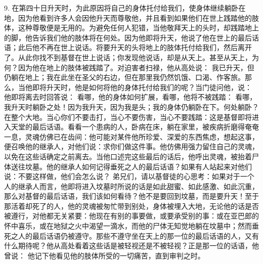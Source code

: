 9. 在第四十日升天时，为此原因将自己的身体托付给我们，使身体继续躺卧在地，因为他看到许多人会因他升天而尊敬他，并且看到如果他们在世上践踏他的肢体，这种尊敬便是无用的。为避免任何人犯错，当他敬拜天上的头时，却践踏地上的脚，他告诉我们他的肢体将在何处。因为他即将升天，他说了他在世上的最后话语；此后他不再在世上说话。将要升天的头将地上的肢体托付给我们，然后离开了。从此你找不到基督在世上说话；你发现他说话，却是从天上。甚至从天上，为何？因为他在地上的肢体被践踏了。对迫害者扫禄，他从高处说： 我已升天，但仍躺在地上；我在此坐在圣父的右边，但在那里我仍然饥饿、口渴、作客旅。那么，当他即将升天时，他是如何将他的身体托付给我们的呢？当门徒问他，说： 他即将离去时回答说： 看哪，他的身体如何扩展，看哪，他将不被践踏： 看哪，我升天时躺卧之处！因为我升天，因为我是头；我的身体仍躺卧在下。何处躺卧？在整个大地。当心你们不要击打，当心不要伤害，当心不要践踏：这是基督即将进入天堂的最后话语。看看一个患病的人，卧病在床，躺在家里，被疾病折磨得奄奄一息，灵魂仿佛已在齿间：他可能对某件他所珍爱、深爱的东西焦虑，想起这事，便召唤他的继承人，对他们说：求你们做这件事。他仿佛用强力留住自己的灵魂，以免在这些话确定之前离去。当他口述完这些最后的话后，他呼出灵魂，被抬着尸体送往坟墓。他的继承人如何记得垂死之人的最后话语？如果有人站起来对他们说：不要这样做，他们会怎么说？ 弟兄们，请以基督徒的心思考：如果对于一个人的继承人而言，他即将进入坟墓时所说的话是如此甜蜜、如此感激、如此沉重，那么对基督的最后话语，我们该如何看待？他不是要回到坟墓，而是要升天！至于那活着却死了的人，他的灵魂被匆忙带到别处，身体被埋入大地，无论他的话是否被遵行，对他都无关紧要：他现在有别的事要做，或要承受别的事：或在亚巴郎的怀中喜乐，或在地狱之火中渴望一滴水，而他的尸体无知觉地躺在坟墓中；然而垂死之人的最后话语仍被遵守。那些不遵守坐在天上的那一位的最后话语的人，又有什么期待呢？他从高处看着这些话是被轻视还是不被轻视？正是那一位的话语，他曾说： 他记下他看见他的肢体所受的一切痛苦，直到审判之时。\par

